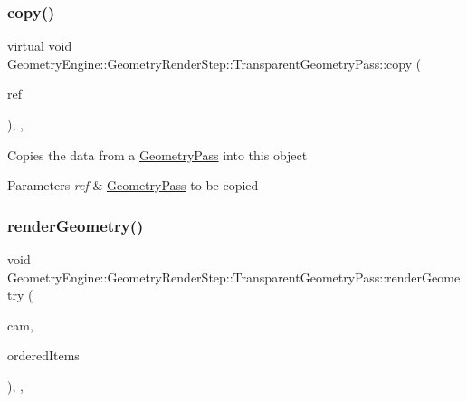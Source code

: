 \subsubsection{\texorpdfstring{copy()}{copy()}}
{\footnotesize\ttfamily virtual void Geometry\+Engine\+::\+Geometry\+Render\+Step\+::\+Transparent\+Geometry\+Pass\+::copy (\begin{DoxyParamCaption}\item[{const \mbox{\hyperlink{class_geometry_engine_1_1_geometry_render_step_1_1_transparent_geometry_pass}{Transparent\+Geometry\+Pass}} \&}]{ref }\end{DoxyParamCaption})\hspace{0.3cm}{\ttfamily [inline]}, {\ttfamily [protected]}, {\ttfamily [virtual]}}

Copies the data from a \mbox{\hyperlink{class_geometry_engine_1_1_geometry_render_step_1_1_geometry_pass}{Geometry\+Pass}} into this object 
\begin{DoxyParams}{Parameters}
{\em ref} & \mbox{\hyperlink{class_geometry_engine_1_1_geometry_render_step_1_1_geometry_pass}{Geometry\+Pass}} to be copied \\
\hline
\end{DoxyParams}
\mbox{\label{class_geometry_engine_1_1_geometry_render_step_1_1_transparent_geometry_pass_a05b2c129cdefb4d5b4d140b683f63f99}} 
\subsubsection{\texorpdfstring{renderGeometry()}{renderGeometry()}}
{\footnotesize\ttfamily void Geometry\+Engine\+::\+Geometry\+Render\+Step\+::\+Transparent\+Geometry\+Pass\+::render\+Geometry (\begin{DoxyParamCaption}\item[{\mbox{\hyperlink{class_geometry_engine_1_1_geometry_world_item_1_1_geometry_camera_1_1_camera}{Geometry\+World\+Item\+::\+Geometry\+Camera\+::\+Camera}} $\ast$}]{cam,  }\item[{std\+::map$<$ float, \mbox{\hyperlink{class_geometry_engine_1_1_geometry_world_item_1_1_geometry_item_1_1_geometry_item}{Geometry\+World\+Item\+::\+Geometry\+Item\+::\+Geometry\+Item}} $\ast$ $>$ $\ast$}]{ordered\+Items }\end{DoxyParamCaption})\hspace{0.3cm}{\ttfamily [override]}, {\ttfamily [protected]}, {\ttfamily [virtual]}}

